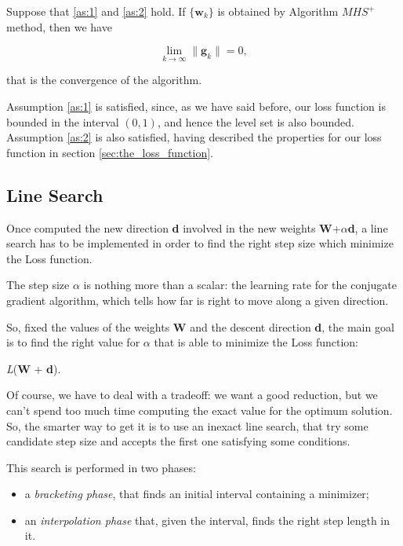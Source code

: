 			\begin{theorem}
				Suppose that \ref{as:1} and \ref{as:2} hold. If $\{\textbf{w}_k\}$ is obtained by Algorithm $MHS^+$ method, then we have
			\end{theorem}

			\begin{equation}
			\label{conv_mhs}
			  \lim_{k \to \infty} \|\textbf{g}_k\| = 0,
			\end{equation}

			that is the convergence of the algorithm.

			Assumption \ref{as:1} is satisfied, since, as we have said before, our loss function is bounded in the
			interval $(0, 1)$, and hence the level set is also bounded. Assumption \ref{as:2} is also satisfied,
			having described the properties for our loss function in section \ref{sec:the_loss_function}.

		\subsection{Line Search}
		\label{sub:line_search}
			Once computed the new direction \textbf{d} involved in the new weights \textbf{W}+$\alpha$\textbf{d}, a line search has to be implemented in order to find the right step size which minimize the Loss function.

			The step size $\alpha$ is nothing more than a scalar: the learning rate for the conjugate gradient algorithm, which tells how far is right to move along a given direction.

			So, fixed the values of the weights \textbf{W} and the descent direction \textbf{d}, the main goal is to find the right value for $\alpha$ that is able to minimize the Loss function:

			 \begin{mini}
			   {\alpha}{\textit{L}(\textbf{W} + \alpha\textbf{d}).}{}{}
			 \end{mini}

			Of course, we have to deal with a tradeoff: we want a good reduction, but we can't spend too much time computing the exact value for the optimum solution. So, the smarter way to get it is to use an inexact line search, that try some candidate step size and accepts the first one satisfying some conditions.

			This search is performed in two phases:
			\begin{itemize}
			\item a \textit{bracketing phase}, that finds an initial interval containing a minimizer;
			\item an \textit{interpolation phase} that, given the interval, finds the right step length in it.
			\end{itemize}

